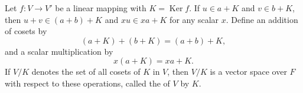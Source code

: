 Let $f: V \rightarrow V'$ be a linear mapping with $K = \operatorname{Ker} f$. If $u \in a + K$ and $v \in b + K$, then $u + v \in (a + b) + K$ and $xu \in xa + K$ for any scalar $x$. Define an addition of cosets by
$$
(a + K) + (b + K) = (a + b) + K,
$$
and a scalar multiplication by
$$
x(a + K) = xa + K.
$$
If $V/K$ denotes the set of all cosets of $K$ in $V$, then $V/K$ is a vector space over $F$ with respect to these operations, called the  of $V$ by $K$.
